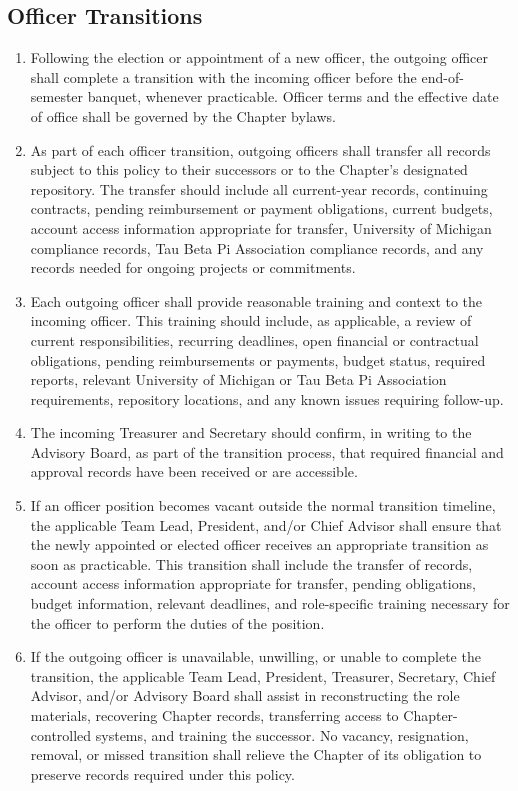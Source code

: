 \subsection{Officer Transitions} \label{XII.10}
\begin{enumerate}
    \item Following the election or appointment of a new officer, the outgoing officer shall complete a transition with the incoming officer before the end-of-semester banquet, 
    whenever practicable. Officer terms and the effective date of office shall be governed by the Chapter bylaws.
    \item As part of each officer transition, outgoing officers shall transfer all records subject to this policy to their successors or to the Chapter’s designated repository. 
    The transfer should include all current-year records, continuing contracts, pending reimbursement or payment obligations, current budgets, account access information appropriate 
    for transfer, University of Michigan compliance records, Tau Beta Pi Association compliance records, and any records needed for ongoing projects or commitments.
    \item Each outgoing officer shall provide reasonable training and context to the incoming officer. This training should include, as applicable, a review of current responsibilities, 
    recurring deadlines, open financial or contractual obligations, pending reimbursements or payments, budget status, required reports, relevant University of Michigan or 
    Tau Beta Pi Association requirements, repository locations, and any known issues requiring follow-up.
    \item The incoming Treasurer and Secretary should confirm, in writing to the Advisory Board, as part of the transition process, that required financial and 
    approval records have been received or are accessible.
    \item If an officer position becomes vacant outside the normal transition timeline, the applicable Team Lead, President, and/or Chief Advisor shall ensure that the newly appointed or 
    elected officer receives an appropriate transition as soon as practicable. This transition shall include the transfer of records, account access information appropriate 
    for transfer, pending obligations, budget information, relevant deadlines, and role-specific training necessary for the officer to perform the duties of the position.
    \item If the outgoing officer is unavailable, unwilling, or unable to complete the transition, the applicable Team Lead, President, Treasurer, Secretary, Chief Advisor, and/or 
    Advisory Board shall assist in reconstructing the role materials, recovering Chapter records, transferring access to Chapter-controlled systems, and training the successor. 
    No vacancy, resignation, removal, or missed transition shall relieve the Chapter of its obligation to preserve records required under this policy.
\end{enumerate}

